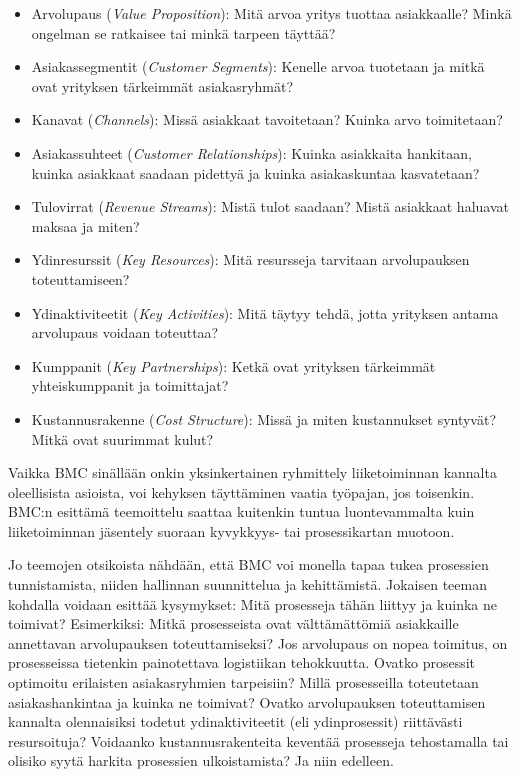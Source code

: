 \documentclass[
  finnish,
  letterpaper,
  DIV=11,
  numbers=noendperiod,
  oneside]{scrreprt}
\providecommand{\tightlist}{%
  \setlength{\itemsep}{0pt}\setlength{\parskip}{0pt}}
\begin{document}
\begin{itemize}
\tightlist
\item
  Arvolupaus (\emph{Value Proposition}): Mitä arvoa yritys tuottaa
  asiakkaalle? Minkä ongelman se ratkaisee tai minkä tarpeen täyttää?
\item
  Asiakassegmentit (\emph{Customer Segments}): Kenelle arvoa tuotetaan
  ja mitkä ovat yrityksen tärkeimmät asiakasryhmät?
\item
  Kanavat (\emph{Channels}): Missä asiakkaat tavoitetaan? Kuinka arvo
  toimitetaan?
\item
  Asiakassuhteet (\emph{Customer Relationships}): Kuinka asiakkaita
  hankitaan, kuinka asiakkaat saadaan pidettyä ja kuinka asiakaskuntaa
  kasvatetaan?
\item
  Tulovirrat (\emph{Revenue Streams}): Mistä tulot saadaan? Mistä
  asiakkaat haluavat maksaa ja miten?
\item
  Ydinresurssit (\emph{Key Resources}): Mitä resursseja tarvitaan
  arvolupauksen toteuttamiseen?
\item
  Ydinaktiviteetit (\emph{Key Activities}): Mitä täytyy tehdä, jotta
  yrityksen antama arvolupaus voidaan toteuttaa?
\item
  Kumppanit (\emph{Key Partnerships}): Ketkä ovat yrityksen tärkeimmät
  yhteiskumppanit ja toimittajat?
\item
  Kustannusrakenne (\emph{Cost Structure}): Missä ja miten kustannukset
  syntyvät? Mitkä ovat suurimmat kulut?
\end{itemize}

Vaikka BMC sinällään onkin yksinkertainen ryhmittely liiketoiminnan
kannalta oleellisista asioista, voi kehyksen täyttäminen vaatia
työpajan, jos toisenkin. BMC:n esittämä teemoittelu saattaa kuitenkin
tuntua luontevammalta kuin liiketoiminnan jäsentely suoraan kyvykkyys-
tai prosessikartan muotoon.

Jo teemojen otsikoista nähdään, että BMC voi monella tapaa tukea
prosessien tunnistamista, niiden hallinnan suunnittelua ja kehittämistä.
Jokaisen teeman kohdalla voidaan esittää kysymykset: Mitä prosesseja
tähän liittyy ja kuinka ne toimivat? Esimerkiksi: Mitkä prosesseista
ovat välttämättömiä asiakkaille annettavan arvolupauksen
toteuttamiseksi? Jos arvolupaus on nopea toimitus, on prosesseissa
tietenkin painotettava logistiikan tehokkuutta. Ovatko prosessit
optimoitu erilaisten asiakasryhmien tarpeisiin? Millä prosesseilla
toteutetaan asiakashankintaa ja kuinka ne toimivat? Ovatko arvolupauksen
toteuttamisen kannalta olennaisiksi todetut ydinaktiviteetit (eli
ydinprosessit) riittävästi resursoituja? Voidaanko kustannusrakenteita
keventää prosesseja tehostamalla tai olisiko syytä harkita prosessien
ulkoistamista? Ja niin edelleen.
\end{document}
